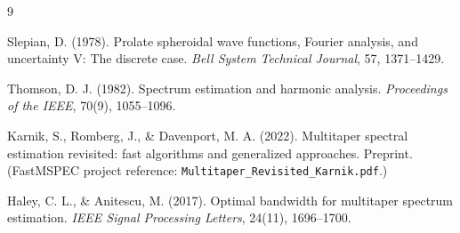 \documentclass[11pt]{article}
\begin{document}
\begin{thebibliography}{9}

Slepian, D. (1978). Prolate spheroidal wave functions, Fourier analysis, and uncertainty V: The
discrete case. \textit{Bell System Technical Journal}, 57, 1371--1429.

Thomson, D. J. (1982). Spectrum estimation and harmonic analysis. \textit{Proceedings of the
IEEE}, 70(9), 1055--1096.

Karnik, S., Romberg, J., \& Davenport, M. A. (2022). Multitaper spectral estimation revisited:
fast algorithms and generalized approaches. Preprint. (FastMSPEC project reference:
\texttt{Multitaper\_Revisited\_Karnik.pdf}.)

Haley, C. L., \& Anitescu, M. (2017). Optimal bandwidth for multitaper spectrum estimation.
\textit{IEEE Signal Processing Letters}, 24(11), 1696--1700.

\end{thebibliography}
\end{document}
